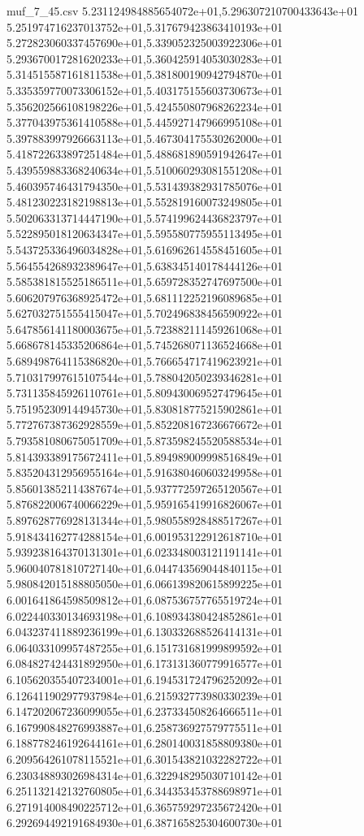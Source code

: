 \begin{filecontents*}{muf_7_45.csv}
5.231124984885654072e+01,5.296307210700433643e+01
5.251974716237013752e+01,5.317679423863410193e+01
5.272823060337457690e+01,5.339052325003922306e+01
5.293670017281620233e+01,5.360425914053030283e+01
5.314515587161811538e+01,5.381800190942794870e+01
5.335359770073306152e+01,5.403175155603730673e+01
5.356202566108198226e+01,5.424550807968262234e+01
5.377043975361410588e+01,5.445927147966995108e+01
5.397883997926663113e+01,5.467304175530262000e+01
5.418722633897251484e+01,5.488681890591942647e+01
5.439559883368240634e+01,5.510060293081551208e+01
5.460395746431794350e+01,5.531439382931785076e+01
5.481230223182198813e+01,5.552819160073249805e+01
5.502063313714447190e+01,5.574199624436823797e+01
5.522895018120634347e+01,5.595580775955113495e+01
5.543725336496034828e+01,5.616962614558451605e+01
5.564554268932389647e+01,5.638345140178444126e+01
5.585381815525186511e+01,5.659728352747697500e+01
5.606207976368925472e+01,5.681112252196089685e+01
5.627032751555415047e+01,5.702496838456590922e+01
5.647856141180003675e+01,5.723882111459261068e+01
5.668678145335206864e+01,5.745268071136524668e+01
5.689498764115386820e+01,5.766654717419623921e+01
5.710317997615107544e+01,5.788042050239346281e+01
5.731135845926110761e+01,5.809430069527479645e+01
5.751952309144945730e+01,5.830818775215902861e+01
5.772767387362928559e+01,5.852208167236676672e+01
5.793581080675051709e+01,5.873598245520588534e+01
5.814393389175672411e+01,5.894989009998516849e+01
5.835204312956955164e+01,5.916380460603249958e+01
5.856013852114387674e+01,5.937772597265120567e+01
5.876822006740066229e+01,5.959165419916826067e+01
5.897628776928131344e+01,5.980558928488517267e+01
5.918434162774288154e+01,6.001953122912618710e+01
5.939238164370131301e+01,6.023348003121191141e+01
5.960040781810727140e+01,6.044743569044840115e+01
5.980842015188805050e+01,6.066139820615899225e+01
6.001641864598509812e+01,6.087536757765519724e+01
6.022440330134693198e+01,6.108934380424852861e+01
6.043237411889236199e+01,6.130332688526414131e+01
6.064033109957487255e+01,6.151731681999899592e+01
6.084827424431892950e+01,6.173131360779916577e+01
6.105620355407234001e+01,6.194531724796252092e+01
6.126411902977937984e+01,6.215932773980330239e+01
6.147202067236099055e+01,6.237334508264666511e+01
6.167990848276993887e+01,6.258736927579775511e+01
6.188778246192644161e+01,6.280140031858809380e+01
6.209564261078115521e+01,6.301543821032282722e+01
6.230348893026984314e+01,6.322948295030710142e+01
6.251132142132760805e+01,6.344353453788698971e+01
6.271914008490225712e+01,6.365759297235672420e+01
6.292694492191684930e+01,6.387165825304600730e+01

\end{filecontents*}
